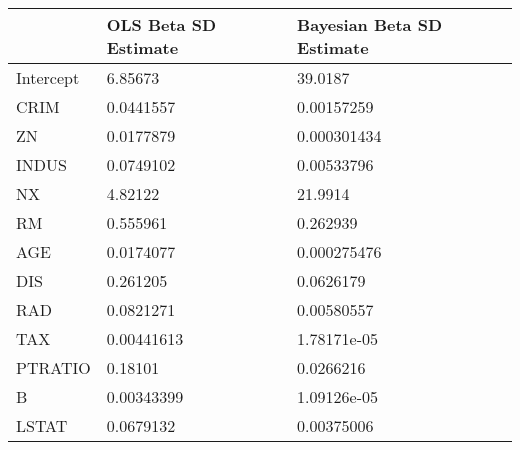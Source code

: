 \begin{tabular}{lll}
\hline
           & OLS Beta SD Estimate   & Bayesian Beta SD Estimate   \\
\hline
 Intercept & 6.85673                & 39.0187                     \\
 CRIM      & 0.0441557              & 0.00157259                  \\
 ZN        & 0.0177879              & 0.000301434                 \\
 INDUS     & 0.0749102              & 0.00533796                  \\
 NX        & 4.82122                & 21.9914                     \\
 RM        & 0.555961               & 0.262939                    \\
 AGE       & 0.0174077              & 0.000275476                 \\
 DIS       & 0.261205               & 0.0626179                   \\
 RAD       & 0.0821271              & 0.00580557                  \\
 TAX       & 0.00441613             & 1.78171e-05                 \\
 PTRATIO   & 0.18101                & 0.0266216                   \\
 B         & 0.00343399             & 1.09126e-05                 \\
 LSTAT     & 0.0679132              & 0.00375006                  \\
\hline
\end{tabular}